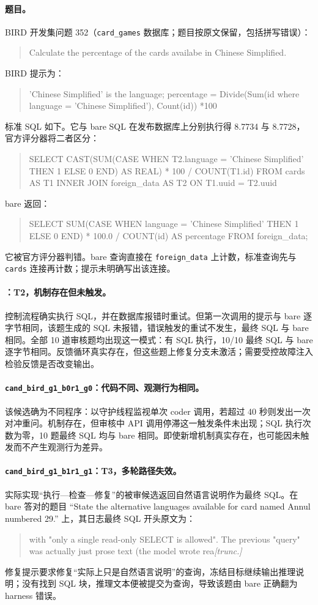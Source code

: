 \paragraph{题目。}BIRD 开发集问题 352（\texttt{card\_games} 数据库；题目按原文保留，包括拼写错误）：
\begin{quote}\small\ttfamily
Calculate the percentage of the cards availabe in Chinese Simplified.
\end{quote}
BIRD 提示为：
\begin{quote}\small\ttfamily
'Chinese Simplified' is the language; percentage = Divide(Sum(id where language = 'Chinese Simplified'), Count(id)) *100
\end{quote}
标准 SQL 如下。它与 bare SQL 在发布数据库上分别执行得 8.7734 与 8.7728，官方评分器将二者区分：
\begin{quote}\small\ttfamily
SELECT CAST(SUM(CASE WHEN T2.language = 'Chinese Simplified' THEN 1 ELSE 0 END) AS REAL) * 100 / COUNT(T1.id) FROM cards AS T1 INNER JOIN foreign\_data AS T2 ON T1.uuid = T2.uuid
\end{quote}
bare 返回：
\begin{quote}\small\ttfamily
SELECT SUM(CASE WHEN language = 'Chinese Simplified' THEN 1 ELSE 0 END) * 100.0 / COUNT(id) AS percentage FROM foreign\_data;
\end{quote}
它被官方评分器判错。bare 查询直接在 \texttt{foreign\_data} 上计数，标准查询先与 \texttt{cards} 连接再计数；提示未明确写出该连接。
\paragraph{\react{}：T2，机制存在但未触发。}控制流程确实执行 SQL，并在数据库报错时重试。但第一次调用的提示与 bare 逐字节相同，该题生成的 SQL 未报错，错误触发的重试不发生，最终 SQL 与 bare 相同。全部 10 道审核题均出现这一模式：有 SQL 执行，10/10 最终 SQL 与 bare 逐字节相同。反馈循环真实存在，但这些题上修复分支未激活；需要受控故障注入检验反馈是否改变输出。
\paragraph{\texttt{cand\_bird\_g1\_b0r1\_g0}：代码不同、观测行为相同。}该候选确为不同程序：以守护线程监视单次 coder 调用，若超过 40 秒则发出一次对冲重问。机制存在，但审核中 API 调用停滞这一触发条件未出现；SQL 执行次数为零，10 题最终 SQL 均与 bare 相同。即使新增机制真实存在，也可能因未触发而不产生观测行为差异。
\paragraph{\texttt{cand\_bird\_g1\_b1r1\_g1}：T3，多轮路径失效。}实际实现“执行—检查—修复”的被审候选返回自然语言说明作为最终 SQL。在 bare 答对的题目 ``State the alternative languages available for card named Annul numbered 29.'' 上，其日志最终 SQL 开头原文为：
\begin{quote}\small\ttfamily
with "only a single read-only SELECT is allowed". The previous "query" was actually just prose text (the model wrote rea\emph{[trunc.]}
\end{quote}
修复提示要求修复“实际上只是自然语言说明”的查询，冻结目标继续输出推理说明；没有找到 SQL 块，推理文本便被提交为查询，导致该题由 bare 正确翻为 harness 错误。
